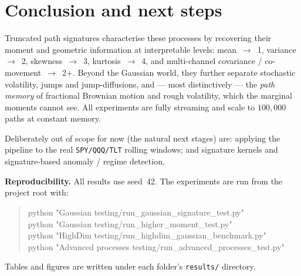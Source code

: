 \documentclass[11pt]{article}
\newcommand{\code}[1]{\texttt{#1}}
\begin{document}
\section{Conclusion and next steps}
Truncated path signatures characterise these processes by recovering their moment
and geometric information at interpretable levels: mean~$\to$~1, variance~$\to$~2,
skewness~$\to$~3, kurtosis~$\to$~4, and multi-channel covariance /
co-movement~$\to$~2+. Beyond the Gaussian world, they further separate stochastic
volatility, jumps and jump-diffusions, and --- most distinctively --- the
\emph{path memory} of fractional Brownian motion and rough volatility, which the
marginal moments cannot see. All experiments are fully streaming and scale to
$100{,}000$ paths at constant memory.

Deliberately out of scope for now (the natural next stages) are: applying the
pipeline to the real \code{SPY/QQQ/TLT} rolling windows; and signature kernels and
signature-based anomaly / regime detection.

\vspace{1em}
\noindent\textbf{Reproducibility.} All results use seed~42. The experiments are
run from the project root with:
\begin{quote}\ttfamily
python "Gaussian testing/run\_gaussian\_signature\_test.py"\\
python "Gaussian testing/run\_higher\_moment\_test.py"\\
python "HighDim testing/run\_highdim\_gaussian\_benchmark.py"\\
python "Advanced processes testing/run\_advanced\_processes\_test.py"
\end{quote}
Tables and figures are written under each folder's \code{results/} directory.
\end{document}
